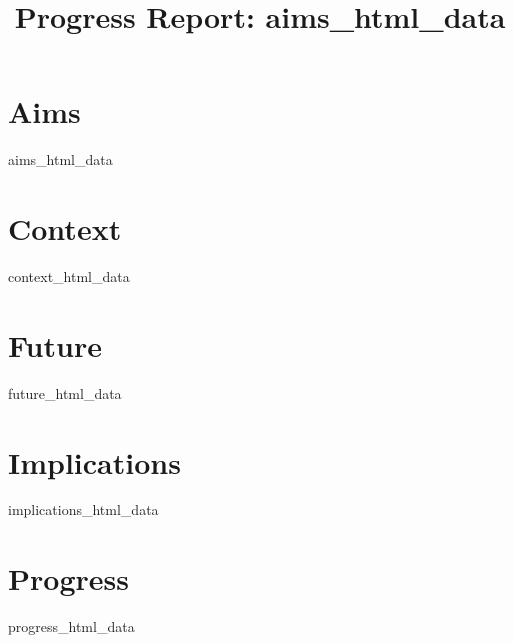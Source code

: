 \documentclass[10pt, a4paper]{article}
\begin{document}
\title{Progress Report: {{aims_html_data}}}
\maketitle

\newenvironment{aims}{\section{{Aims}}}{}
\newenvironment{context}{\section{{Context}}}{}
\newenvironment{future}{\section{{Future}}}{}
\newenvironment{implications}{\section{{Implications}}}{}
\newenvironment{progress}{\section{{Progress}}}{}

\begin{aims}
{{aims_html_data}}
\end{aims}

\begin{context}
{{context_html_data}}
\end{context}

\begin{future}
{{future_html_data}}
\end{future}

\begin{implications}
{{implications_html_data}}
\end{implications}

\begin{progress}
{{progress_html_data}}
\end{progress}
\end{document}
